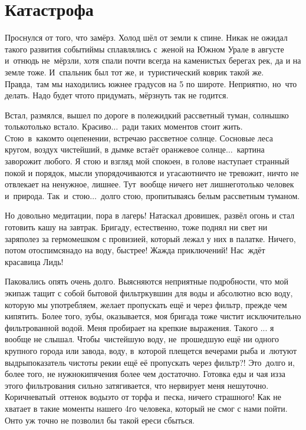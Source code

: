 \chapter{Катастрофа}
\vepsianrose

Проснулся от того, что замёрз. Холод шёл от земли к спине. Никак не ожидал такого развития событий\mdash мы сплавлялись с~женой на Южном Урале в августе и~отнюдь не~мёрзли, хотя спали почти всегда на каменистых берегах рек, да и на земле тоже. И~спальник был тот же, и~туристический коврик такой же. Правда,~там мы находились южнее градусов на 5 по широте. Неприятно, но~что делать. Надо будет что\sdash то придумать, мёрзнуть так не годится. 

Встал, размялся, вышел по дороге в поле\mdash жидкий рассветный туман, солнышко только\sdash только встало. Красиво$\ldots$~ради таких моментов стоит жить. Стою~в~каком\sdash то оцепенении, встречаю рассветное солнце. Сосновые леса кругом, воздух чистейший, в дымке встаёт оранжевое солнце$\ldots$~картина заворожит любого. Я стою и взгляд мой спокоен, в голове наступает странный покой и порядок, мысли упорядочиваются и угасают\mdash ничто не тревожит, ничто не отвлекает на ненужное, лишнее. Тут~вообще ничего нет лишнего\mdash только человек и~природа. Так~и~стою$\ldots$~долго стою, пропитываясь белым рассветным туманом.

Но довольно медитации, пора в лагерь! Натаскал дровишек, развёл огонь и стал готовить кашу на завтрак. Бригаду, естественно, тоже поднял ни свет ни заря\mdash полез за гермомешком с провизией, который лежал у них в палатке. Ничего, потом отоспимся\mdash надо на воду, быстрее! Жажда приключений! Нас~ждёт красавица Лидь! 

Паковались опять очень долго. Выясняются неприятные подробности, что мой экипаж тащит с собой бытовой фильтр\sdash кувшин для воды и абсолютно всю воду, которую мы употребляем, желает пропускать ещё и через фильтр, прежде чем кипятить. Более того, зубы, оказывается, моя бригада тоже чистит исключительно фильтрованной водой. Меня пробирает на крепкие выражения. Такого ... я вообще не слышал. Чтобы~чистейшую воду, не~прошедшую ещё ни одного крупного города или завода, воду, в~которой плещется вечерами рыба и~лютуют выдры\mdash показатель чистоты реки\mdash и ещё её пропускать через фильтр?! Это~долго и, более того, не нужно\mdash кипячения более чем достаточно. Готовка еды и чая из\sdash за этого фильтрования сильно затягивается, что нервирует меня нешуточно. Коричневатый~оттенок воды\mdash это от торфа и~песка, ничего страшного! Как не хватает в такие моменты нашего 4\sdash го человека, который не смог с нами пойти. Он\sdash то уж точно не позволил бы такой ереси сбыться. 

